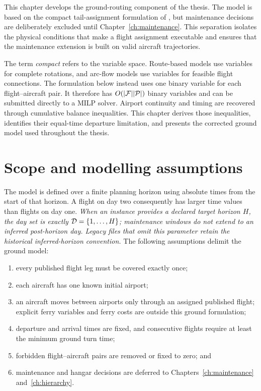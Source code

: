 This chapter develops the ground-routing component of the thesis. The model is
based on the compact tail-assignment formulation of
\citet{khaled2018compact}, but maintenance decisions are deliberately excluded
until Chapter~\ref{ch:maintenance}. This separation isolates the physical
conditions that make a flight assignment executable and ensures that the
maintenance extension is built on valid aircraft trajectories.

The term \emph{compact} refers to the variable space. Route-based models use
variables for complete rotations, and arc-flow models use variables for
feasible flight connections. The formulation below instead uses one binary
variable for each flight--aircraft pair. It therefore has
$O(|\mathcal{F}||\mathcal{P}|)$ binary variables and can be submitted directly to a MILP
solver. Airport continuity and timing are recovered through cumulative balance
inequalities. This chapter derives those inequalities, identifies their
equal-time departure limitation, and presents the corrected ground model used
throughout the thesis.

\section{Scope and modelling assumptions}
\label{sec:basic}

The model is defined over a finite planning horizon using absolute times from
the start of that horizon. A flight on day two consequently has larger time
values than flights on day one. \textit{When an instance provides a declared
target horizon $H$, the day set is exactly $\mathcal{D}=\{1,\ldots,H\}$; maintenance
windows do not extend to an inferred post-horizon day. Legacy files that omit
this parameter retain the historical inferred-horizon convention.} The following assumptions delimit the ground
model:
\begin{enumerate}
    \item every published flight leg must be covered exactly once;
    \item each aircraft has one known initial airport;
    \item an aircraft moves between airports only through an assigned published
    flight; explicit ferry variables and ferry costs are outside this ground
    formulation;
    \item departure and arrival times are fixed, and consecutive flights require
    at least the minimum ground turn time;
    \item forbidden flight--aircraft pairs are removed or fixed to zero; and
    \item maintenance and hangar decisions are deferred to
    Chapters~\ref{ch:maintenance} and~\ref{ch:hierarchy}.
\end{enumerate}

